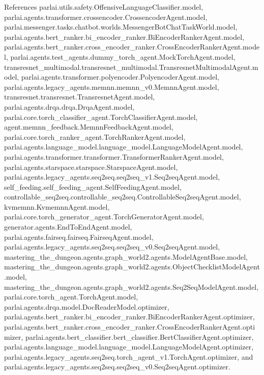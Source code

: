 References parlai.\+utils.\+safety.\+Offensive\+Language\+Classifier.\+model, parlai.\+agents.\+transformer.\+crossencoder.\+Crossencoder\+Agent.\+model, parlai.\+messenger.\+tasks.\+chatbot.\+worlds.\+Messenger\+Bot\+Chat\+Task\+World.\+model, parlai.\+agents.\+bert\+\_\+ranker.\+bi\+\_\+encoder\+\_\+ranker.\+Bi\+Encoder\+Ranker\+Agent.\+model, parlai.\+agents.\+bert\+\_\+ranker.\+cross\+\_\+encoder\+\_\+ranker.\+Cross\+Encoder\+Ranker\+Agent.\+model, parlai.\+agents.\+test\+\_\+agents.\+dummy\+\_\+torch\+\_\+agent.\+Mock\+Torch\+Agent.\+model, transresnet\+\_\+multimodal.\+transresnet\+\_\+multimodal.\+Transresnet\+Multimodal\+Agent.\+model, parlai.\+agents.\+transformer.\+polyencoder.\+Polyencoder\+Agent.\+model, parlai.\+agents.\+legacy\+\_\+agents.\+memnn.\+memnn\+\_\+v0.\+Memnn\+Agent.\+model, transresnet.\+transresnet.\+Transresnet\+Agent.\+model, parlai.\+agents.\+drqa.\+drqa.\+Drqa\+Agent.\+model, parlai.\+core.\+torch\+\_\+classifier\+\_\+agent.\+Torch\+Classifier\+Agent.\+model, agent.\+memnn\+\_\+feedback.\+Memnn\+Feedback\+Agent.\+model, parlai.\+core.\+torch\+\_\+ranker\+\_\+agent.\+Torch\+Ranker\+Agent.\+model, parlai.\+agents.\+language\+\_\+model.\+language\+\_\+model.\+Language\+Model\+Agent.\+model, parlai.\+agents.\+transformer.\+transformer.\+Transformer\+Ranker\+Agent.\+model, parlai.\+agents.\+starspace.\+starspace.\+Starspace\+Agent.\+model, parlai.\+agents.\+legacy\+\_\+agents.\+seq2seq.\+seq2seq\+\_\+v1.\+Seq2seq\+Agent.\+model, self\+\_\+feeding.\+self\+\_\+feeding\+\_\+agent.\+Self\+Feeding\+Agent.\+model, controllable\+\_\+seq2seq.\+controllable\+\_\+seq2seq.\+Controllable\+Seq2seq\+Agent.\+model, kvmemnn.\+Kvmemnn\+Agent.\+model, parlai.\+core.\+torch\+\_\+generator\+\_\+agent.\+Torch\+Generator\+Agent.\+model, generator.\+agents.\+End\+To\+End\+Agent.\+model, parlai.\+agents.\+fairseq.\+fairseq.\+Fairseq\+Agent.\+model, parlai.\+agents.\+legacy\+\_\+agents.\+seq2seq.\+seq2seq\+\_\+v0.\+Seq2seq\+Agent.\+model, mastering\+\_\+the\+\_\+dungeon.\+agents.\+graph\+\_\+world2.\+agents.\+Model\+Agent\+Base.\+model, mastering\+\_\+the\+\_\+dungeon.\+agents.\+graph\+\_\+world2.\+agents.\+Object\+Checklist\+Model\+Agent.\+model, mastering\+\_\+the\+\_\+dungeon.\+agents.\+graph\+\_\+world2.\+agents.\+Seq2\+Seq\+Model\+Agent.\+model, parlai.\+core.\+torch\+\_\+agent.\+Torch\+Agent.\+model, parlai.\+agents.\+drqa.\+model.\+Doc\+Reader\+Model.\+optimizer, parlai.\+agents.\+bert\+\_\+ranker.\+bi\+\_\+encoder\+\_\+ranker.\+Bi\+Encoder\+Ranker\+Agent.\+optimizer, parlai.\+agents.\+bert\+\_\+ranker.\+cross\+\_\+encoder\+\_\+ranker.\+Cross\+Encoder\+Ranker\+Agent.\+optimizer, parlai.\+agents.\+bert\+\_\+classifier.\+bert\+\_\+classifier.\+Bert\+Classifier\+Agent.\+optimizer, parlai.\+agents.\+language\+\_\+model.\+language\+\_\+model.\+Language\+Model\+Agent.\+optimizer, parlai.\+agents.\+legacy\+\_\+agents.\+seq2seq.\+torch\+\_\+agent\+\_\+v1.\+Torch\+Agent.\+optimizer, and parlai.\+agents.\+legacy\+\_\+agents.\+seq2seq.\+seq2seq\+\_\+v0.\+Seq2seq\+Agent.\+optimizer.




